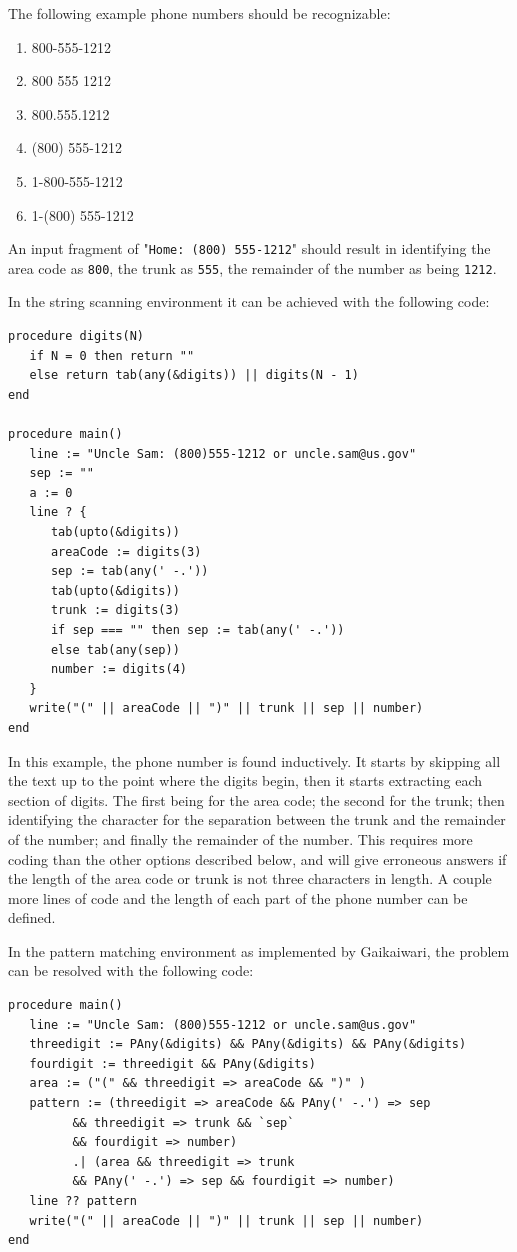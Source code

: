 \documentclass{article}
\begin{document}
The following example phone numbers should be recognizable:

\begin{singlespace}
\begin{enumerate}
\item 800-555-1212
\item 800 555 1212
\item 800.555.1212
\item (800) 555-1212
\item 1-800-555-1212
\item 1-(800) 555-1212
\end{enumerate}
\end{singlespace}

An input fragment of "\texttt{Home: (800) 555-1212}" should result in identifying the area code as \texttt{800}, the trunk as \texttt{555}, the remainder of the number as being \texttt{1212}.

In the string scanning environment it can be achieved with the following code:
\begin{verbatim}
procedure digits(N)
   if N = 0 then return ""
   else return tab(any(&digits)) || digits(N - 1)
end

procedure main()
   line := "Uncle Sam: (800)555-1212 or uncle.sam@us.gov"
   sep := ""
   a := 0
   line ? {
      tab(upto(&digits))
      areaCode := digits(3)
      sep := tab(any(' -.'))
      tab(upto(&digits))
      trunk := digits(3)
      if sep === "" then sep := tab(any(' -.'))
      else tab(any(sep))
      number := digits(4)
   }
   write("(" || areaCode || ")" || trunk || sep || number)
end
\end{verbatim}
In this example, the phone number is found inductively.  It starts by skipping all the text up to the point where the digits begin, then it starts extracting each section of digits.  The first being for the area code; the second for the trunk; then identifying the character for the separation between the trunk and the remainder of the number; and finally the remainder of the number.  This requires more coding than the other options described below, and will give erroneous answers if the length of the area code or trunk is not three characters in length.  A couple more lines of code and the length of each part of the phone number can be defined.

In the pattern matching environment as implemented by Gaikaiwari, the problem can be resolved with the following code:
\begin{verbatim}
procedure main()
   line := "Uncle Sam: (800)555-1212 or uncle.sam@us.gov"
   threedigit := PAny(&digits) && PAny(&digits) && PAny(&digits)
   fourdigit := threedigit && PAny(&digits)
   area := ("(" && threedigit => areaCode && ")" )
   pattern := (threedigit => areaCode && PAny(' -.') => sep
         && threedigit => trunk && `sep`
         && fourdigit => number)
         .| (area && threedigit => trunk
         && PAny(' -.') => sep && fourdigit => number)
   line ?? pattern
   write("(" || areaCode || ")" || trunk || sep || number) 
end
\end{verbatim}
\end{document}
